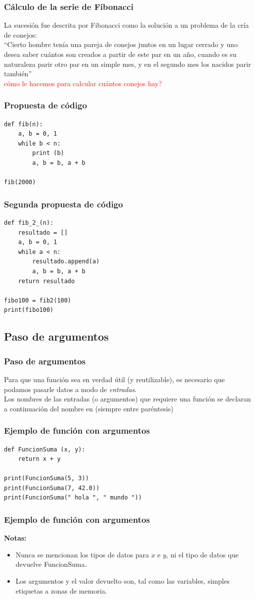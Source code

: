 \begin{frame}
\frametitle{Cálculo de la serie de Fibonacci}
La sucesión fue descrita por Fibonacci como la solución a un problema de la cría de conejos: 
\\
\bigskip
\enquote{Cierto hombre tenía una pareja de conejos juntos en un lugar cerrado y uno desea saber cuántos son creados a partir de este par en un año, cuando es su naturaleza parir otro par en un simple mes, y en el segundo mes los nacidos parir también}
\\
\bigskip
\pause
\textcolor{red}{cómo le hacemos para calcular cuántos conejos hay?}
\end{frame}
\begin{frame}[fragile]
\frametitle{Propuesta de código}
\begin{lstlisting}[style=codigopython]
def fib(n):
    a, b = 0, 1
    while b < n:
        print (b)
        a, b = b, a + b

fib(2000)
\end{lstlisting}
\end{frame}
\begin{frame}[fragile]
\frametitle{Segunda propuesta de código}
\begin{lstlisting}[style=codigopython]
def fib_2_(n):
    resultado = []
    a, b = 0, 1
    while a < n:
        resultado.append(a)
        a, b = b, a + b
    return resultado

fibo100 = fib2(100)
print(fibo100)
\end{lstlisting}
\end{frame}
\subsection{Paso de argumentos}
\begin{frame}[fragile]
\frametitle{Paso de argumentos}
Para que una función sea en verdad útil (y reutilizable), es necesario que podamos pasarle datos a modo de \emph{entradas}. 
\\
\bigskip
Los nombres de las entradas (o argumentos) que requiere una función se declaran a continuación del nombre en  (siempre entre paréntesis)
\end{frame}
\begin{frame}[fragile]
\frametitle{Ejemplo de función con argumentos}
\begin{lstlisting}
def FuncionSuma (x, y):
    return x + y

print(FuncionSuma(5, 3))
print(FuncionSuma(7, 42.0))
print(FuncionSuma(" hola ", " mundo "))
\end{lstlisting}
\end{frame}
\begin{frame}[fragile]
\frametitle{Ejemplo de función con argumentos}
\textbf{Notas:} 
\begin{itemize}[<+->]
\item Nunca se mencionan los tipos de datos para $x$ e $y$, ni el tipo de datos que devuelve FuncionSuma.
\item Los argumentos y el valor devuelto son, tal como las variables, simples etiquetas a zonas de memoria.
\end{itemize}  
\end{frame}
